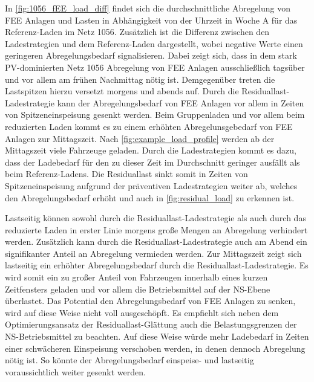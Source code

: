 

In \autoref{fig:1056_fEE_load_diff} findet sich die durchschnittliche Abregelung von \gls{FEE} Anlagen und Lasten in Abhängigkeit von der Uhrzeit in Woche A für das Referenz-Laden im Netz \num{1056}.
Zusätzlich ist die Differenz zwischen den Ladestrategien und dem Referenz-Laden dargestellt, wobei negative Werte einen geringeren Abregelungsbedarf signalisieren.
Dabei zeigt sich, dass in dem stark \gls{PV}-dominierten Netz \num{1056} Abregelung von \gls{FEE} Anlagen ausschließlich tagsüber und vor allem am frühen Nachmittag nötig ist.
Demgegenüber treten die Lastspitzen hierzu versetzt morgens und abends auf.
Durch die Residuallast-Ladestrategie kann der Abregelungsbedarf von \gls{FEE} Anlagen vor allem in Zeiten von Spitzeneinspeisung gesenkt werden.
Beim Gruppenladen und vor allem beim reduzierten Laden kommt es zu einem erhöhten Abregelunsgebedarf von \gls{FEE} Anlagen zur Mittagszeit.
Nach \autoref{fig:example_load_profile} werden ab der Mittagszeit viele Fahrzeuge \zH geladen.
Durch die Ladestrategien kommt es dazu, dass der Ladebedarf für den \UC \zH zu dieser Zeit im Durchschnitt geringer ausfällt als beim Referenz-Ladens.
Die Residuallast sinkt somit in Zeiten von Spitzeneinspeisung aufgrund der präventiven Ladestrategien weiter ab, welches den Abregelungsbedarf erhöht und auch in \autoref{fig:residual_load} zu erkennen ist.




Lastseitig können sowohl durch die Residuallast-Ladestrategie als auch durch das reduzierte Laden in erster Linie morgens große Mengen an Abregelung verhindert werden.
Zusätzlich kann durch die Residuallast-Ladestrategie auch am Abend ein signifikanter Anteil an Abregelung vermieden werden.
Zur Mittagszeit zeigt sich lastseitig ein erhöhter Abregelungsbedarf durch die Residuallast-Ladestrategie.
Es wird somit ein zu großer Anteil von Fahrzeugen innerhalb eines kurzen Zeitfensters geladen und vor allem die Betriebsmittel auf der \gls{NS}-Ebene überlastet.
Das Potential den Abregelungsbedarf von \gls{FEE} Anlagen zu senken, wird auf diese Weise nicht voll ausgeschöpft.
Es empfiehlt sich neben dem Optimierungsansatz der Residuallast-Glättung auch die Belastungsgrenzen der \gls{NS}-Betriebsmittel zu beachten.
Auf diese Weise würde mehr Ladebedarf in Zeiten einer schwächeren Einspeisung verschoben werden, in denen dennoch Abregelung nötig ist.
So könnte der Abregelungsbedarf einspeise- und lastseitig voraussichtlich weiter gesenkt werden.\medskip



